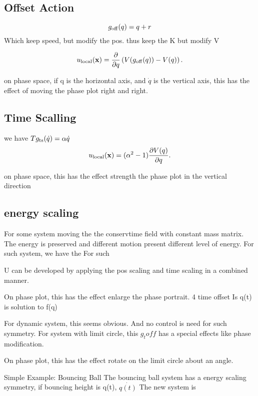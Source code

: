 \subsection*{ Offset Action}
\[
g_{\mathrm{off}}(q) = q+r
\]
Which keep speed, but modify the pos. thus keep the K but modify V

\begin{equation}
u_{\mathrm{local}}(\mathbf{x}) = \frac{\partial}{\partial q} \left(V(g_{\mathrm{off}}(q)) - V(q)\right).
\end{equation}

on phase space, if q is the horizontal axis, and $\dot{q}$ is the vertical axis, this has the effect of moving the phase plot right and right.
\subsection*{Time Scalling}

we have
$Tg_{\mathrm{ts}}(\dot{q})=\alpha \dot{q}$
\begin{equation}
u_{\mathrm{local}}(\mathbf{x}) = (\alpha^2 - 1) \frac{\partial V(q)}{\partial q}.
\end{equation}

on phase space, this has the effect strength the phase plot in the vertical direction

\subsection*{energy scaling}
For some system moving the the conservtime field with constant mass matrix.
The energy is preserved and different motion present different level of energy.
For such system, we have the 
For such

U can be developed by applying the pos scaling and time scaling in a combined manner.

On phase plot, this has the effect enlarge the phase portrait.
4 time offset
Is q(t) is solution to f(q)

For dynamic system, this seems obvious. And no control is need for such symmetry.
For system with limit circle, this $g_toff$ has a special effects like phase modification.

On phase plot, this has the effect rotate on the limit circle about an angle.







Simple Example:
Bouncing Ball
The bouncing ball system has a energy scaling symmetry, if bouncing height is q(t), $\dot{q(t)}$
The new system is 
